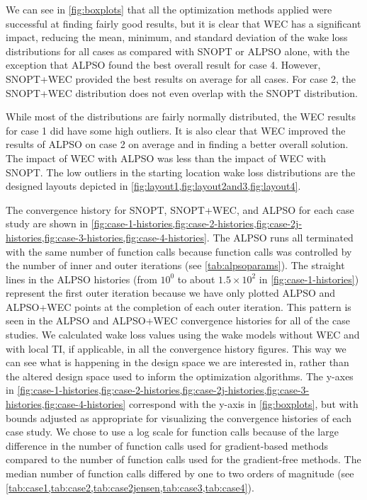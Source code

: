 \documentclass{jpconf}
\begin{document}
We can see in \cref{fig:boxplots} that all the optimization methods applied were successful at finding fairly good results, but it is clear that WEC has a significant impact, reducing the mean, minimum, and standard deviation of the wake loss distributions for all cases as compared with SNOPT or ALPSO alone, with the exception that ALPSO found the best overall result for case 4. However, SNOPT+WEC  provided the best results on average for all cases. For case 2, the SNOPT+WEC distribution does not even overlap with the SNOPT distribution. 

While most of the distributions are fairly normally distributed, the WEC results for case 1 did have some high outliers. It is also clear that WEC improved the results of ALPSO on case 2 on average and in finding a better overall solution. The impact of WEC with ALPSO was less than the impact of WEC with SNOPT. The low outliers in the starting location wake loss distributions are the designed layouts depicted in \cref{fig:layout1,fig:layout2and3,fig:layout4}.

The convergence history for SNOPT, SNOPT+WEC, and ALPSO for each case study are shown in \cref{fig:case-1-histories,fig:case-2-histories,fig:case-2j-histories,fig:case-3-histories,fig:case-4-histories}. The ALPSO runs all terminated with the same number of function calls because function calls was controlled by the number of inner and outer iterations (see \cref{tab:alpsoparams}). The straight lines in the ALPSO histories (from $10^0$ to about $1.5\times10^2$ in \cref{fig:case-1-histories}) represent the first outer iteration because we have only plotted ALPSO and ALPSO+WEC points at the completion of each outer iteration. This pattern is seen in the ALPSO and ALPSO+WEC convergence histories for all of the case studies. 
We calculated wake loss values using the wake models without WEC and with local TI, if applicable, in all the convergence history figures. This way we can see what is happening in the design space we are interested in, rather than the altered design space used to inform the optimization algorithms. The y-axes in \cref{fig:case-1-histories,fig:case-2-histories,fig:case-2j-histories,fig:case-3-histories,fig:case-4-histories} correspond with the y-axis in \cref{fig:boxplots}, but with bounds adjusted as appropriate for visualizing the convergence histories of each case study. We chose to use a log scale for function calls because of the large difference in the number of function calls used for gradient-based methods compared to the number of function calls used for the gradient-free methods. The median number of function calls differed by one to two orders of magnitude (see \cref{tab:case1,tab:case2,tab:case2jensen,tab:case3,tab:case4}).
\end{document}
